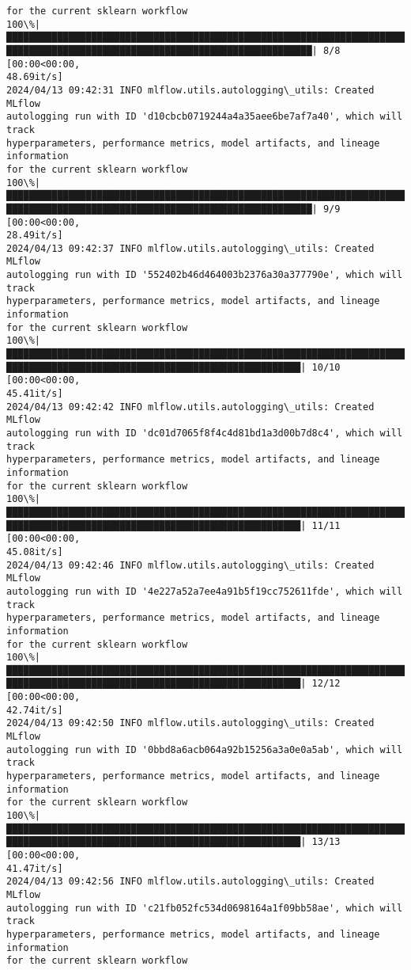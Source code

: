 \documentclass[11pt]{article}
\begin{document}
\begin{Verbatim}[commandchars=\\\{\}]
for the current sklearn workflow
100\%|███████████████████████████████████████████████████████████████████████████
██████████████████████████████████████████████████████| 8/8 [00:00<00:00,
48.69it/s]
2024/04/13 09:42:31 INFO mlflow.utils.autologging\_utils: Created MLflow
autologging run with ID 'd10cbcb0719244a4a35aee6be7af7a40', which will track
hyperparameters, performance metrics, model artifacts, and lineage information
for the current sklearn workflow
100\%|███████████████████████████████████████████████████████████████████████████
██████████████████████████████████████████████████████| 9/9 [00:00<00:00,
28.49it/s]
2024/04/13 09:42:37 INFO mlflow.utils.autologging\_utils: Created MLflow
autologging run with ID '552402b46d464003b2376a30a377790e', which will track
hyperparameters, performance metrics, model artifacts, and lineage information
for the current sklearn workflow
100\%|███████████████████████████████████████████████████████████████████████████
████████████████████████████████████████████████████| 10/10 [00:00<00:00,
45.41it/s]
2024/04/13 09:42:42 INFO mlflow.utils.autologging\_utils: Created MLflow
autologging run with ID 'dc01d7065f8f4c4d81bd1a3d00b7d8c4', which will track
hyperparameters, performance metrics, model artifacts, and lineage information
for the current sklearn workflow
100\%|███████████████████████████████████████████████████████████████████████████
████████████████████████████████████████████████████| 11/11 [00:00<00:00,
45.08it/s]
2024/04/13 09:42:46 INFO mlflow.utils.autologging\_utils: Created MLflow
autologging run with ID '4e227a52a7ee4a91b5f19cc752611fde', which will track
hyperparameters, performance metrics, model artifacts, and lineage information
for the current sklearn workflow
100\%|███████████████████████████████████████████████████████████████████████████
████████████████████████████████████████████████████| 12/12 [00:00<00:00,
42.74it/s]
2024/04/13 09:42:50 INFO mlflow.utils.autologging\_utils: Created MLflow
autologging run with ID '0bbd8a6acb064a92b15256a3a0e0a5ab', which will track
hyperparameters, performance metrics, model artifacts, and lineage information
for the current sklearn workflow
100\%|███████████████████████████████████████████████████████████████████████████
████████████████████████████████████████████████████| 13/13 [00:00<00:00,
41.47it/s]
2024/04/13 09:42:56 INFO mlflow.utils.autologging\_utils: Created MLflow
autologging run with ID 'c21fb052fc534d0698164a1f09bb58ae', which will track
hyperparameters, performance metrics, model artifacts, and lineage information
for the current sklearn workflow

\end{Verbatim}
\end{document}

